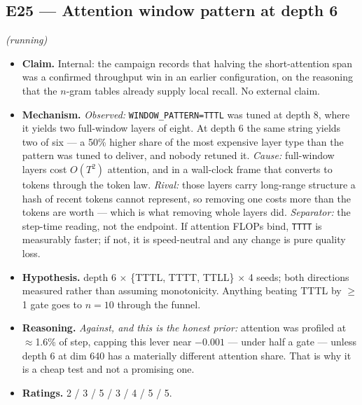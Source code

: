 \documentclass{article}
\begin{document}
\subsection{E25 --- Attention window pattern at depth 6} \emph{(running)}
\begin{itemize}\itemsep2pt
\item \textbf{Claim.} Internal: the campaign records that halving the short-attention span was a confirmed throughput win in an earlier configuration, on the reasoning that the $n$-gram tables already supply local recall. No external claim.
\item \textbf{Mechanism.} \emph{Observed:} \texttt{WINDOW\_PATTERN=TTTL} was tuned at depth 8, where it yields two full-window layers of eight. At depth 6 the same string yields two of six --- a 50\% higher share of the most expensive layer type than the pattern was tuned to deliver, and nobody retuned it. \emph{Cause:} full-window layers cost $O(T^2)$ attention, and in a wall-clock frame that converts to tokens through the token law. \emph{Rival:} those layers carry long-range structure a hash of recent tokens cannot represent, so removing one costs more than the tokens are worth --- which is what removing whole layers did. \emph{Separator:} the step-time reading, not the endpoint. If attention FLOPs bind, \texttt{TTTT} is measurably faster; if not, it is speed-neutral and any change is pure quality loss.
\item \textbf{Hypothesis.} depth 6 $\times$ \{TTTL, TTTT, TTLL\} $\times$ 4 seeds; both directions measured rather than assuming monotonicity. Anything beating TTTL by $\ge$1 gate goes to $n{=}10$ through the funnel.
\item \textbf{Reasoning.} \emph{Against, and this is the honest prior:} attention was profiled at $\approx$1.6\% of step, capping this lever near $-0.001$ --- under half a gate --- unless depth 6 at dim 640 has a materially different attention share. That is why it is a cheap test and not a promising one.
\item \textbf{Ratings.} 2 / 3 / 5 / 3 / 4 / 5 / 5.
\end{itemize}
\end{document}
